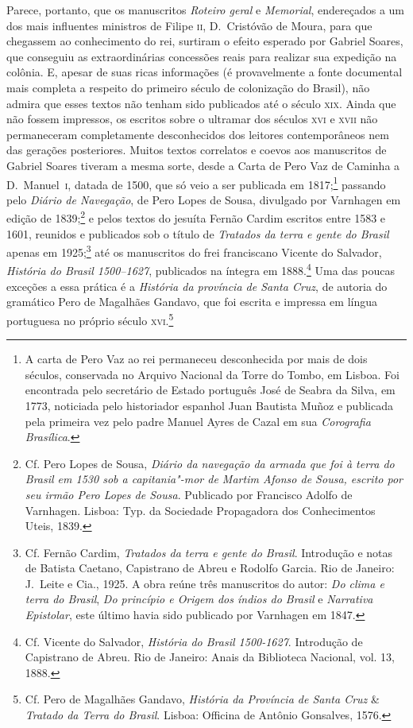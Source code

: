 \documentclass[12pt]{extarticle}
\begin{document}
Parece, portanto, que os manuscritos \textit{Roteiro geral} e
\textit{Memorial}, endereçados a um dos mais influentes ministros de
Filipe 	\textsc{ii}, D.~Cristóvão de Moura, para que chegassem ao conhecimento do
rei, surtiram o efeito esperado por Gabriel Soares, que conseguiu as
extraordinárias concessões reais para realizar sua expedição na
colônia. E, apesar de suas ricas informações (é provavelmente a fonte
documental mais completa a respeito do primeiro século de colonização
do Brasil), não admira que esses textos não tenham sido publicados até
o século \textsc{xix}. Ainda que não fossem impressos, os escritos sobre o
ultramar dos séculos \textsc{xvi} e \textsc{xvii} não permaneceram completamente
desconhecidos dos leitores contemporâneos nem das gerações posteriores.
Muitos textos correlatos e coevos aos manuscritos de Gabriel Soares
tiveram a mesma sorte, desde a Carta de Pero Vaz de Caminha a D.~Manuel~\textsc{i}, 
datada de 1500, que só veio a ser publicada em 1817;\footnote{ A
carta de Pero Vaz ao rei permaneceu desconhecida por mais de dois
séculos, conservada no Arquivo Nacional da Torre do Tombo, em Lisboa.
Foi encontrada pelo secretário de Estado português José de Seabra da
Silva, em 1773, noticiada pelo historiador espanhol Juan Bautista Muñoz
e publicada pela primeira vez pelo padre Manuel Ayres de Cazal em sua
\textit{Corografia Brasílica}.} passando pelo
\textit{Diário de Navegação}, de Pero Lopes de Sousa, divulgado por
Varnhagen em edição de 1839;\footnote{ Cf. Pero Lopes de Sousa, \textit{Diário da navegação da armada que 
foi à terra do Brasil em 1530 sob a capitania"-mor de Martim Afonso de Sousa,
escrito por seu irmão Pero Lopes de Sousa}. Publicado por Francisco Adolfo de Varnhagen. 
Lisboa: Typ. da Sociedade Propagadora dos Conhecimentos Uteis, 1839.} e pelos textos do jesuíta Fernão Cardim
escritos entre 1583 e 1601, reunidos e publicados 
sob o título de \textit{Tratados da terra e gente do Brasil} apenas em
1925;\footnote{ Cf. Fernão Cardim, \textit{Tratados da terra e gente do Brasil}. 
Introdução e notas de Batista Caetano, Capistrano de Abreu e Rodolfo Garcia. 
Rio de Janeiro: J.~Leite e Cia., 1925. 
A obra reúne três manuscritos do autor: \textit{Do clima e terra do Brasil}, \textit{Do princípio e Origem dos índios do Brasil}
e \textit{Narrativa Epistolar}, este último havia sido publicado por Varnhagen em 1847.} até os manuscritos do frei franciscano Vicente do Salvador,
\textit{História do Brasil 1500--1627}, publicados na íntegra em 1888.\footnote{ Cf. Vicente do Salvador, \textit{História do Brasil 1500-1627}.
Introdução de Capistrano de Abreu. Rio de Janeiro: Anais da Biblioteca Nacional, vol. 13, 1888.}
Uma das poucas exceções a essa prática é a \textit{História da
província de Santa Cruz}, de autoria do gramático Pero de
Magalhães Gandavo, que foi escrita e impressa em língua portuguesa no
próprio século \textsc{xvi}.\footnote{ Cf. Pero de Magalhães Gandavo,
\textit{História da Província de Santa Cruz} \& \textit{Tratado da
Terra do Brasil}. Lisboa: Officina de Antônio Gonsalves, 1576.}
\end{document}
